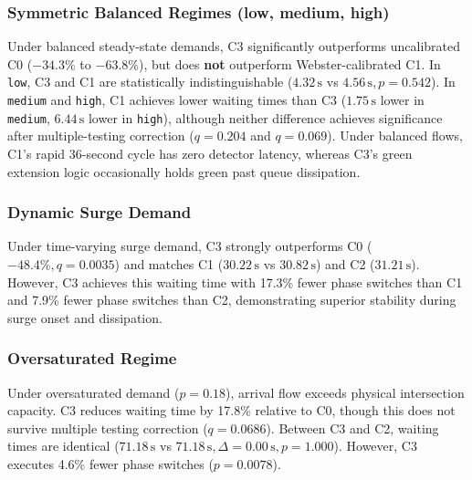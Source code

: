 \documentclass[11pt,journal,onecolumn]{article}
\begin{document}
\subsubsection{Symmetric Balanced Regimes (low, medium, high)}
Under balanced steady-state demands, C3 significantly outperforms uncalibrated C0 ($-34.3\%$ to $-63.8\%$), but does \textbf{not} outperform Webster-calibrated C1. In \texttt{low}, C3 and C1 are statistically indistinguishable ($4.32\,\text{s}$ vs $4.56\,\text{s}, p = 0.542$). In \texttt{medium} and \texttt{high}, C1 achieves lower waiting times than C3 ($1.75\,\text{s}$ lower in \texttt{medium}, $6.44\,\text{s}$ lower in \texttt{high}), although neither difference achieves significance after multiple-testing correction ($q = 0.204$ and $q = 0.069$). Under balanced flows, C1's rapid 36-second cycle has zero detector latency, whereas C3's green extension logic occasionally holds green past queue dissipation.

\subsubsection{Dynamic Surge Demand}
Under time-varying surge demand, C3 strongly outperforms C0 ($-48.4\%, q = 0.0035$) and matches C1 ($30.22\,\text{s}$ vs $30.82\,\text{s}$) and C2 ($31.21\,\text{s}$). However, C3 achieves this waiting time with 17.3\% fewer phase switches than C1 and 7.9\% fewer phase switches than C2, demonstrating superior stability during surge onset and dissipation.

\subsubsection{Oversaturated Regime}
Under oversaturated demand ($p=0.18$), arrival flow exceeds physical intersection capacity. C3 reduces waiting time by 17.8\% relative to C0, though this does not survive multiple testing correction ($q = 0.0686$). Between C3 and C2, waiting times are identical ($71.18\,\text{s}$ vs $71.18\,\text{s}, \Delta = 0.00\,\text{s}, p = 1.000$). However, C3 executes 4.6\% fewer phase switches ($p = 0.0078$).
\end{document}
